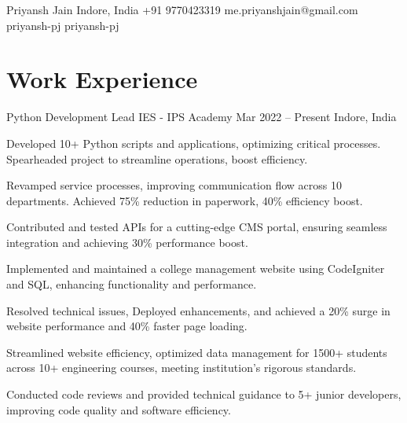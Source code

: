 \documentclass[letterpaper]{config}
\begin{document}
\Header
    {Priyansh Jain} %
    {Indore, India}
    {+91 9770423319} %
    {me.priyanshjain@gmail.com} %
    {priyansh-pj} %
    {priyansh-pj}

\section{Work Experience}
\WorkExperience
    {Python Development Lead} %
    {IES - IPS Academy} %
    {Mar 2022 -- Present} %
    {Indore, India} %
    {
        \item Developed 10+ Python scripts and applications, optimizing critical processes. Spearheaded project to streamline operations, boost efficiency.
        \item Revamped service processes, improving communication flow across 10 departments. Achieved 75\% reduction in paperwork, 40\% efficiency boost.
        \item Contributed and tested APIs for a cutting-edge CMS portal, ensuring seamless integration and achieving 30\% performance boost.
        \item Implemented and maintained a college management website using CodeIgniter and SQL, enhancing functionality and performance.
        \item Resolved technical issues, Deployed enhancements, and achieved a 20\% surge in website performance and 40\% faster page loading.
        \item Streamlined website efficiency, optimized data management for 1500+ students across 10+ engineering courses, meeting institution's rigorous standards.
        \item Conducted code reviews and provided technical guidance to 5+ junior developers, improving code quality and software efficiency.
    } 
    
\end{document}
